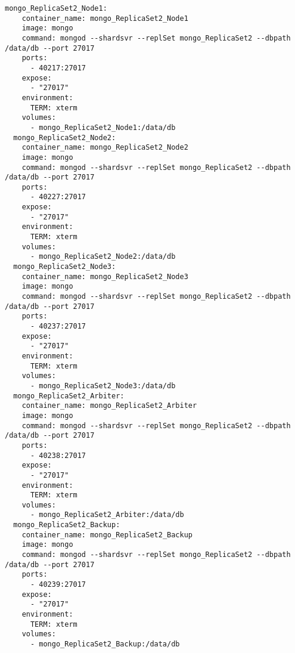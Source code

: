\begin{lstlisting}[caption=Docker Compose Nodes for replica set 2]
mongo_ReplicaSet2_Node1:
    container_name: mongo_ReplicaSet2_Node1
    image: mongo
    command: mongod --shardsvr --replSet mongo_ReplicaSet2 --dbpath /data/db --port 27017
    ports:
      - 40217:27017
    expose:
      - "27017"
    environment:
      TERM: xterm
    volumes:
      - mongo_ReplicaSet2_Node1:/data/db
  mongo_ReplicaSet2_Node2:
    container_name: mongo_ReplicaSet2_Node2
    image: mongo
    command: mongod --shardsvr --replSet mongo_ReplicaSet2 --dbpath /data/db --port 27017
    ports:
      - 40227:27017
    expose:
      - "27017"
    environment:
      TERM: xterm
    volumes:
      - mongo_ReplicaSet2_Node2:/data/db
  mongo_ReplicaSet2_Node3:
    container_name: mongo_ReplicaSet2_Node3
    image: mongo
    command: mongod --shardsvr --replSet mongo_ReplicaSet2 --dbpath /data/db --port 27017
    ports:
      - 40237:27017
    expose:
      - "27017"
    environment:
      TERM: xterm
    volumes:
      - mongo_ReplicaSet2_Node3:/data/db
  mongo_ReplicaSet2_Arbiter:
    container_name: mongo_ReplicaSet2_Arbiter
    image: mongo
    command: mongod --shardsvr --replSet mongo_ReplicaSet2 --dbpath /data/db --port 27017
    ports:
      - 40238:27017
    expose:
      - "27017"
    environment:
      TERM: xterm
    volumes:
      - mongo_ReplicaSet2_Arbiter:/data/db
  mongo_ReplicaSet2_Backup:
    container_name: mongo_ReplicaSet2_Backup
    image: mongo
    command: mongod --shardsvr --replSet mongo_ReplicaSet2 --dbpath /data/db --port 27017
    ports:
      - 40239:27017
    expose:
      - "27017"
    environment:
      TERM: xterm
    volumes:
      - mongo_ReplicaSet2_Backup:/data/db
\end{lstlisting}


